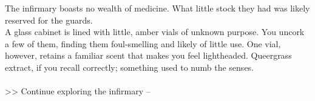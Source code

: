 The infirmary boasts no wealth of medicine. What little stock they had was likely reserved for the guards.\\

A glass cabinet is lined with little, amber vials of unknown purpose. You uncork a few of them, finding them foul-smelling and likely of little use. One vial, however, retains a familiar scent that makes you feel lightheaded. Queergrass extract, if you recall correctly; something used to numb the senses.\\
\\

>> Continue exploring the infirmary -- 